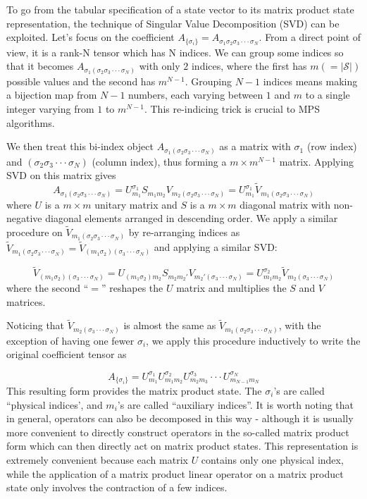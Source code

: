 \documentclass[english]{article}
\begin{document}
To go from the tabular specification of a state vector to its matrix product state representation, the technique of Singular Value Decomposition (SVD) can be exploited. Let's focus on the coefficient $A_{\{\sigma_{i}\}}=A_{\sigma_{1}\sigma_{2}\sigma_{3}\cdot\cdot\cdot\sigma_{N}}$.
From a direct point of view, it is a rank-N tensor which has N indices.
We can group some indices so that it becomes $A_{\sigma_{1}(\sigma_{2}\sigma_{3}\cdot\cdot\cdot\sigma_{N})}$
with only $2$ indices, where the first has $m(=|\mathcal{S}|)$ possible values and
the second has $m^{N-1}$. Grouping $N-1$ indices means making a
bijection map from $N-1$ numbers, each varying between $1$ and $m$ to
a single integer varying from $1$ to $m^{N-1}$. This re-indicing
trick is crucial to MPS algorithms.

We then treat this bi-index object $A_{\sigma_{1}(\sigma_{2}\sigma_{3}\cdot\cdot\cdot\sigma_{N})}$
as a matrix with $\sigma_{1}$  (row index) and $(\sigma_{2}\sigma_{3}\cdot\cdot\cdot\sigma_{N})$
 (column index), thus forming a $m\times m^{N-1}$ matrix. Applying
SVD on this matrix gives 
\[
A_{\sigma_{1}(\sigma_{2}\sigma_{3}\cdot\cdot\cdot\sigma_{N})}=U_{m_{1}}^{\sigma_{1}}S_{m_{1}m_{2}}V_{m_{2}(\sigma_{2}\sigma_{3}\cdot\cdot\cdot\sigma_{N})}=U_{m_{1}}^{\sigma_{1}}\tilde{V}_{m_{1}(\sigma_{2}\sigma_{3}\cdot\cdot\cdot\sigma_{N})}
\]
where $U$ is a $m\times m$ unitary matrix and $S$ is a $m\times m$
diagonal matrix with non-negative diagonal elements arranged in descending
order. We apply a similar procedure on $\tilde{V}_{m_{1}(\sigma_{2}\sigma_{3}\cdot\cdot\cdot\sigma_{N})}$
by re-arranging indices as $\tilde{V}_{m_{1}(\sigma_{2}\sigma_{3}\cdot\cdot\cdot\sigma_{N})}=\tilde{V}_{(m_{1}\sigma_{2})(\sigma_{3}\cdot\cdot\cdot\sigma_{N})}$
and applying a similar SVD:

\[
\tilde{V}_{(m_{1}\sigma_{2})(\sigma_{3}\cdot\cdot\cdot\sigma_{N})}=U_{(m_{1}\sigma_{2})m_{2}}S_{m_{2}m_{2}'}V_{m_{2}'(\sigma_{3}\cdot\cdot\cdot\sigma_{N})}=U_{m_{1}m_{2}}^{\sigma_{2}}\tilde{V}_{m_{2}(\sigma_{3}\cdot\cdot\cdot\sigma_{N})}
\]
where the second ``$=$'' reshapes the $U$ matrix and multiplies
the $S$ and $V$ matrices. 

Noticing that $\tilde{V}_{m_{2}(\sigma_{3}\cdot\cdot\cdot\sigma_{N})}$
is almost the same as $\tilde{V}_{m_{1}(\sigma_{2}\sigma_{3}\cdot\cdot\cdot\sigma_{N})}$,
with the exception of having one fewer $\sigma_{i}$, we apply this procedure
inductively to write the original coefficient tensor as

\[
A_{\{\sigma_{i}\}}=U_{m_{1}}^{\sigma_{1}}U_{m_{1}m_{2}}^{\sigma_{2}}U_{m_{2}m_{3}}^{\sigma_{3}}\cdot\cdot\cdot U_{m_{N-1}m_{N}}^{\sigma_{N}}
\]
This resulting form  provides the matrix product state. The $\sigma_{i}$'s
are called ``physical indices', and $m_{i}$'s are called ``auxiliary
indices''. It is worth noting that in general, operators can also
be decomposed in this way - although it is usually more convenient
to directly construct operators in the so-called matrix product form which can then directly act on matrix product states. This representation
is extremely convenient because each matrix $U$ contains only one physical
index, while the application of a matrix product linear operator
on a matrix product state only involves the contraction of a few indices.
\end{document}
